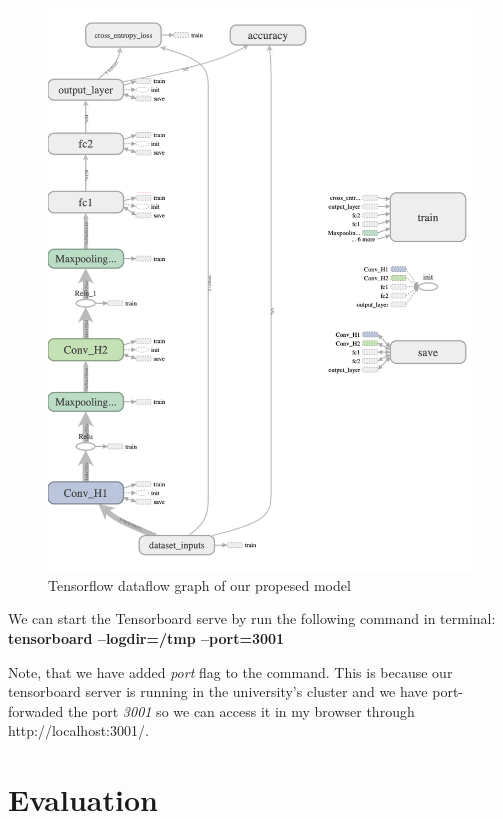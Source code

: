 \begin{figure}[H]
  \centering
  \includegraphics[scale=0.40]{images/Chapter5/graph.png}
  \caption{Tensorflow dataflow graph of our propesed model}
  \label{fig:graph}
\end{figure}

We can start the Tensorboard serve by run the following command in terminal:
\newline
\textbf{tensorboard --logdir=/tmp --port=3001}
\newline

Note, that we have added \textit{port} flag to the command. This is because our tensorboard server is running in the university's cluster and we have port-forwaded the port \textit{3001} so we can access it in my browser through http://localhost:3001/.

\section{Evaluation}
